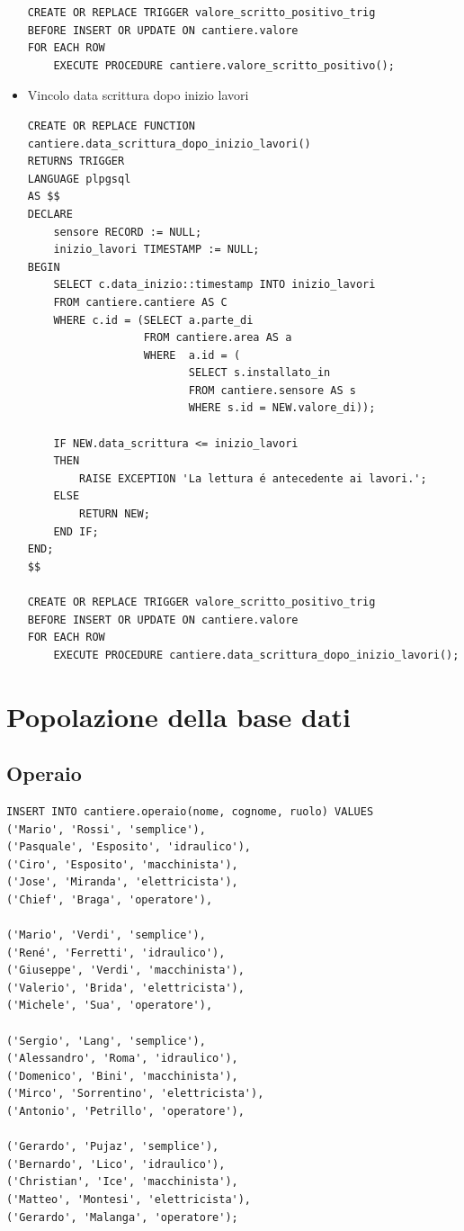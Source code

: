 \documentclass[11pt]{article}
\begin{document}
\begin{itemize}
\begin{verbatim}
CREATE OR REPLACE TRIGGER valore_scritto_positivo_trig
BEFORE INSERT OR UPDATE ON cantiere.valore
FOR EACH ROW
    EXECUTE PROCEDURE cantiere.valore_scritto_positivo();
\end{verbatim}
\item Vincolo data scrittura dopo inizio lavori
\label{sec:org9661cae}
\begin{verbatim}
CREATE OR REPLACE FUNCTION
cantiere.data_scrittura_dopo_inizio_lavori()
RETURNS TRIGGER
LANGUAGE plpgsql
AS $$
DECLARE
    sensore RECORD := NULL;
    inizio_lavori TIMESTAMP := NULL;
BEGIN
    SELECT c.data_inizio::timestamp INTO inizio_lavori
    FROM cantiere.cantiere AS C
    WHERE c.id = (SELECT a.parte_di
                  FROM cantiere.area AS a
                  WHERE  a.id = (
                         SELECT s.installato_in
                         FROM cantiere.sensore AS s
                         WHERE s.id = NEW.valore_di));
    
    IF NEW.data_scrittura <= inizio_lavori
    THEN
        RAISE EXCEPTION 'La lettura é antecedente ai lavori.';
    ELSE
        RETURN NEW;
    END IF;
END;
$$

CREATE OR REPLACE TRIGGER valore_scritto_positivo_trig
BEFORE INSERT OR UPDATE ON cantiere.valore
FOR EACH ROW
    EXECUTE PROCEDURE cantiere.data_scrittura_dopo_inizio_lavori();
\end{verbatim}
\end{itemize}
\section*{Popolazione della base dati}
\label{sec:org12a2614}
\subsection*{Operaio}
\label{sec:org1bdac36}
\begin{verbatim}
INSERT INTO cantiere.operaio(nome, cognome, ruolo) VALUES
('Mario', 'Rossi', 'semplice'),
('Pasquale', 'Esposito', 'idraulico'),
('Ciro', 'Esposito', 'macchinista'),
('Jose', 'Miranda', 'elettricista'),
('Chief', 'Braga', 'operatore'),

('Mario', 'Verdi', 'semplice'),
('René', 'Ferretti', 'idraulico'),
('Giuseppe', 'Verdi', 'macchinista'),
('Valerio', 'Brida', 'elettricista'),
('Michele', 'Sua', 'operatore'),

('Sergio', 'Lang', 'semplice'),
('Alessandro', 'Roma', 'idraulico'),
('Domenico', 'Bini', 'macchinista'),
('Mirco', 'Sorrentino', 'elettricista'),
('Antonio', 'Petrillo', 'operatore'),

('Gerardo', 'Pujaz', 'semplice'),
('Bernardo', 'Lico', 'idraulico'),
('Christian', 'Ice', 'macchinista'),
('Matteo', 'Montesi', 'elettricista'),
('Gerardo', 'Malanga', 'operatore');
\end{verbatim}
\end{document}
